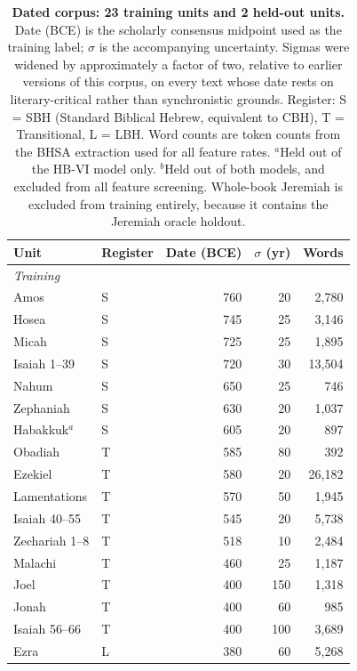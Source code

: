 \begin{table}[!ht]
\centering
\caption{\textbf{Dated corpus: 23 training units and 2 held-out units.}
Date (BCE) is the scholarly consensus midpoint used as the training label;
$\sigma$ is the accompanying uncertainty.  Sigmas were widened by
approximately a factor of two, relative to earlier versions of this corpus,
on every text whose date rests on literary-critical rather than
synchronistic grounds.  Register: S = SBH (Standard Biblical Hebrew,
equivalent to CBH), T = Transitional, L = LBH.  Word counts are token
counts from the BHSA extraction used for all feature rates.
$^a$Held out of the HB-VI model only.
$^b$Held out of both models, and excluded from all feature screening.
Whole-book Jeremiah is excluded from training entirely, because it
contains the Jeremiah oracle holdout.}
\begin{tabular}{llrrr}
\hline
\textbf{Unit} & \textbf{Register} & \textbf{Date (BCE)} & \textbf{$\sigma$ (yr)} & \textbf{Words} \\
\hline
\multicolumn{5}{l}{\textit{Training}} \\
Amos                  & S & 760 & 20 & 2{,}780 \\
Hosea                 & S & 745 & 25 & 3{,}146 \\
Micah                 & S & 725 & 25 & 1{,}895 \\
Isaiah 1--39          & S & 720 & 30 & 13{,}504 \\
Nahum                 & S & 650 & 25 & 746 \\
Zephaniah             & S & 630 & 20 & 1{,}037 \\
Habakkuk$^a$          & S & 605 & 20 & 897 \\
Obadiah               & T & 585 & 80 & 392 \\
Ezekiel               & T & 580 & 20 & 26{,}182 \\
Lamentations          & T & 570 & 50 & 1{,}945 \\
Isaiah 40--55         & T & 545 & 20 & 5{,}738 \\
Zechariah 1--8        & T & 518 & 10 & 2{,}484 \\
Malachi               & T & 460 & 25 & 1{,}187 \\
Joel                  & T & 400 & 150 & 1{,}318 \\
Jonah                 & T & 400 & 60 & 985 \\
Isaiah 56--66         & T & 400 & 100 & 3{,}689 \\
Ezra                  & L & 380 & 60 & 5{,}268 \\

\end{tabular}
\end{table}
